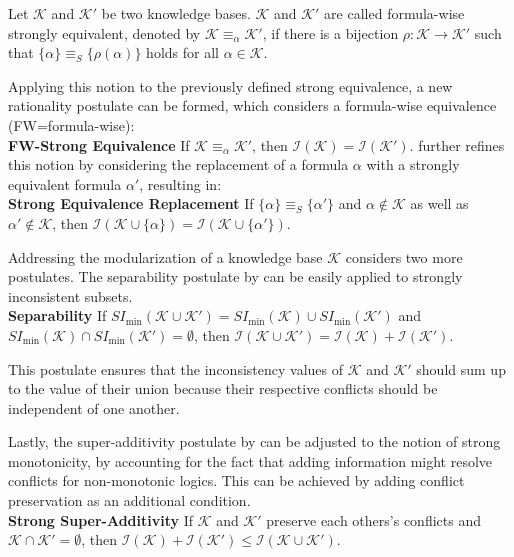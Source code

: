 \begin{definition}
    Let \(\mathcal{K}\) and \(\mathcal{K}'\) be two knowledge bases. \(\mathcal{K}\) and \(\mathcal{K}'\) are called formula-wise strongly equivalent, denoted by \(\mathcal{K} \equiv_{\alpha} \mathcal{K}'\), if there is a bijection \(\rho : \mathcal{K} \rightarrow \mathcal{K}'\) such that \(\{\alpha\} \equiv_S \{\rho(\alpha)\}\) holds for all \(\alpha \in \mathcal{K}\).
\end{definition}

Applying this notion to the previously defined strong equivalence, a new rationality postulate can be formed, which considers a formula-wise equivalence (FW=formula-wise):
\\
\textbf{FW-Strong Equivalence}
If \(\mathcal{K} \equiv_{\alpha} \mathcal{K}'\), then \(\mathcal{I}(\mathcal{K}) = \mathcal{I}(\mathcal{K}')\).
\cite{ulbricht_handling_2020} further refines this notion by considering the replacement of a formula \(\alpha\) with a strongly equivalent formula \(\alpha'\), resulting in:
\\
\textbf{Strong Equivalence Replacement}
If \(\{\alpha\} \equiv_S \{\alpha'\}\) and \(\alpha \notin \mathcal{K}\) as well as \(\alpha' \notin \mathcal{K}\), then \(\mathcal{I}(\mathcal{K} \cup \{\alpha\}) = \mathcal{I}(\mathcal{K} \cup \{\alpha'\})\).

Addressing the modularization of a knowledge base \(\mathcal{K}\) \cite{ulbricht_measuring_2018} considers two more postulates. The separability postulate by \cite{hunter_measure_2010} can be easily applied to strongly inconsistent subsets.
\\
\textbf{Separability}
If \(SI_{\min}(\mathcal{K} \cup \mathcal{K}') = SI_{\min}(\mathcal{K}) \cup SI_{\min}(\mathcal{K}')\) and \(SI_{\min}(\mathcal{K}) \cap SI_{\min}(\mathcal{K}') = \emptyset\), then \(\mathcal{I}(\mathcal{K} \cup \mathcal{K}') = \mathcal{I}(\mathcal{K}) + \mathcal{I}(\mathcal{K}')\).

This postulate ensures that the inconsistency values of \(\mathcal{K}\) and \(\mathcal{K}'\) should sum up to the value of their union because their respective conflicts should be independent of one another.

Lastly, the super-additivity postulate by \cite{thimm_measuring_2009} can be adjusted to the notion of strong monotonicity, by accounting for the fact that adding information might resolve conflicts for non-monotonic logics. This can be achieved by adding conflict preservation as an additional condition.
\\
\textbf{Strong Super-Additivity}
If \(\mathcal{K}\) and \(\mathcal{K}'\) preserve each others's conflicts and \(\mathcal{K} \cap \mathcal{K}' = \emptyset\), then \(\mathcal{I}(\mathcal{K}) + \mathcal{I}(\mathcal{K'}) \leq \mathcal{I}(\mathcal{K} \cup \mathcal{K}')\).

